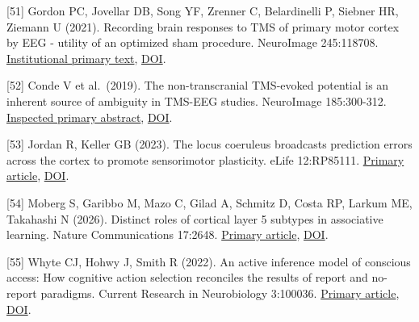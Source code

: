 \documentclass[
  american,
  11pt,
  letterpaper,
]{article}
\begin{document}
{[}51{]} Gordon PC, Jovellar DB, Song YF, Zrenner C, Belardinelli P, Siebner HR, Ziemann U (2021). Recording brain responses to TMS of primary motor cortex by EEG - utility of an optimized sham procedure. NeuroImage 245:118708. \href{https://iris.unitn.it/retrieve/handle/11572/325772/512900/Gordon_NI_2021.pdf}{Institutional primary text}, \href{https://doi.org/10.1016/j.neuroimage.2021.118708}{DOI}.

{[}52{]} Conde V et al.~(2019). The non-transcranial TMS-evoked potential is an inherent source of ambiguity in TMS-EEG studies. NeuroImage 185:300-312. \href{https://pubmed.ncbi.nlm.nih.gov/30347282/}{Inspected primary abstract}, \href{https://doi.org/10.1016/j.neuroimage.2018.10.052}{DOI}.

{[}53{]} Jordan R, Keller GB (2023). The locus coeruleus broadcasts prediction errors across the cortex to promote sensorimotor plasticity. eLife 12:RP85111. \href{https://pmc.ncbi.nlm.nih.gov/articles/PMC10328511/}{Primary article}, \href{https://doi.org/10.7554/eLife.85111}{DOI}.

{[}54{]} Moberg S, Garibbo M, Mazo C, Gilad A, Schmitz D, Costa RP, Larkum ME, Takahashi N (2026). Distinct roles of cortical layer 5 subtypes in associative learning. Nature Communications 17:2648. \href{https://pmc.ncbi.nlm.nih.gov/articles/PMC13004866/}{Primary article}, \href{https://doi.org/10.1038/s41467-026-68307-5}{DOI}.

{[}55{]} Whyte CJ, Hohwy J, Smith R (2022). An active inference model of conscious access: How cognitive action selection reconciles the results of report and no-report paradigms. Current Research in Neurobiology 3:100036. \href{https://pmc.ncbi.nlm.nih.gov/articles/PMC9593308/}{Primary article}, \href{https://doi.org/10.1016/j.crneur.2022.100036}{DOI}.

\endgroup
\end{document}
